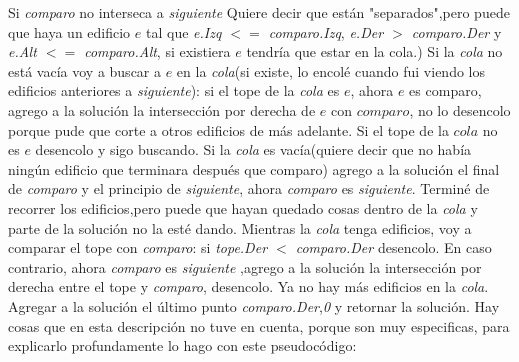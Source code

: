 \documentclass{article}
\begin{document}
Si \textit{comparo} no interseca a \textit{siguiente}\newline
Quiere decir que están "separados",pero puede que haya un edificio $e$ tal que \textit{e.Izq $<=$ comparo.Izq}, \textit{e.Der $>$ comparo.Der} y \textit{e.Alt $<=$ comparo.Alt}, si existiera $e$ tendría que estar en la cola.)\newline
Si la \textit{cola} no está vacía voy a buscar a $e$ en la \textit{cola}(si existe, lo encolé cuando fui viendo los edificios anteriores a \textit{siguiente}):\newline
si el tope de la \textit{cola} es $e$, ahora $e$ es comparo, agrego a la solución la intersección por derecha de $e$ con $comparo$, no lo desencolo porque pude que corte a otros edificios de más adelante.\newline
Si el tope de la $cola$ no es $e$ desencolo y sigo buscando.
Si la \textit{cola} es vacía(quiere decir que no había ningún edificio que terminara \newline después que comparo) agrego a la solución el final de \textit{comparo} y el principio de \textit{siguiente}, ahora \textit{comparo} es \textit{siguiente}.
\newline
Terminé de recorrer los edificios,pero puede que hayan quedado cosas dentro de la \textit{cola} y parte de la solución no la esté dando.\newline
Mientras la \textit{cola} tenga edificios, voy a comparar el tope con \textit{comparo}:\newline
si \textit{tope.Der $<$ comparo.Der} desencolo.\newline
En caso contrario, ahora \textit{comparo} es \textit{siguiente} ,agrego a la solución la intersección por derecha entre el tope y \textit{comparo}, desencolo.\newline
Ya no hay más edificios en la \textit{cola}.
Agregar a la solución el último punto \textit{comparo.Der},\textit{0} y retornar la solución.
\newline
Hay cosas que en esta descripción no tuve en cuenta, porque son muy especificas, para explicarlo profundamente lo hago con este pseudocódigo: 
\newpage
 
\end{document}
